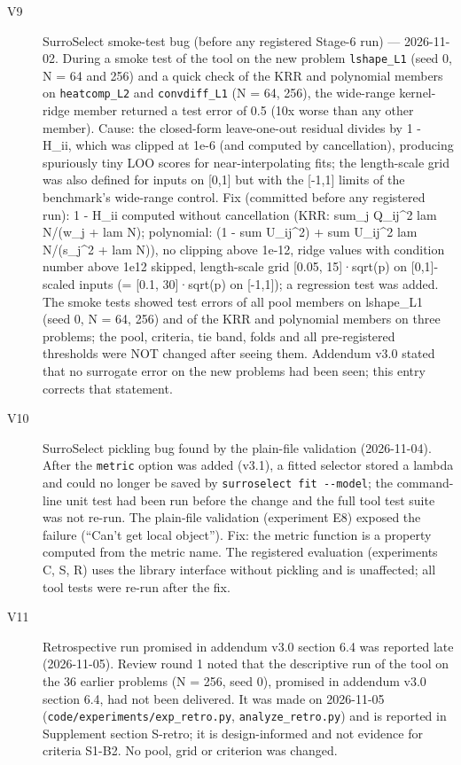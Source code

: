 \begin{description}
\item[V9] SurroSelect smoke-test bug (before any registered Stage-6 run) --- 2026-11-02. During a smoke test of the tool on the new problem \texttt{lshape\_\allowbreak{}L1} (seed 0, N = 64 and 256) and a quick check of the KRR and polynomial members on \texttt{heatcomp\_\allowbreak{}L2} and \texttt{convdiff\_\allowbreak{}L1} (N = 64, 256), the wide-range kernel-ridge member returned a test error of 0.5 (10x worse than any other member). Cause: the closed-form leave-one-out residual divides by 1 - H\_ii, which was clipped at 1e-6 (and computed by cancellation), producing spuriously tiny LOO scores for near-interpolating fits; the length-scale grid was also defined for inputs on {[}0,1{]} but with the {[}-1,1{]} limits of the benchmark's wide-range control. Fix (committed before any registered run): 1 - H\_ii computed without cancellation (KRR: sum\_j Q\_ij\^{}2 lam N/(w\_j + lam N); polynomial: (1 - sum U\_ij\^{}2) + sum U\_ij\^{}2 lam N/(s\_j\^{}2 + lam N)), no clipping above 1e-12, ridge values with condition number above 1e12 skipped, length-scale grid {[}0.05, 15{]}·sqrt(p) on {[}0,1{]}-scaled inputs (= {[}0.1, 30{]}·sqrt(p) on {[}-1,1{]}); a regression test was added. The smoke tests showed test errors of all pool members on lshape\_L1 (seed 0, N = 64, 256) and of the KRR and polynomial members on three problems; the pool, criteria, tie band, folds and all pre-registered thresholds were NOT changed after seeing them. Addendum v3.0 stated that no surrogate error on the new problems had been seen; this entry corrects that statement.
\item[V10] SurroSelect pickling bug found by the plain-file validation (2026-11-04). After the \texttt{metric} option was added (v3.1), a fitted selector stored a lambda and could no longer be saved by \texttt{surroselect\ fit\ -\/\allowbreak{}-model}; the command-line unit test had been run before the change and the full tool test suite was not re-run. The plain-file validation (experiment E8) exposed the failure (``Can't get local object''). Fix: the metric function is a property computed from the metric name. The registered evaluation (experiments C, S, R) uses the library interface without pickling and is unaffected; all tool tests were re-run after the fix.
\item[V11] Retrospective run promised in addendum v3.0 section 6.4 was reported late (2026-11-05). Review round 1 noted that the descriptive run of the tool on the 36 earlier problems (N = 256, seed 0), promised in addendum v3.0 section 6.4, had not been delivered. It was made on 2026-11-05 (\texttt{code/\allowbreak{}experiments/\allowbreak{}exp\_\allowbreak{}retro.py}, \texttt{analyze\_\allowbreak{}retro.py}) and is reported in Supplement section S-retro; it is design-informed and not evidence for criteria S1-B2. No pool, grid or criterion was changed.

\end{description}
